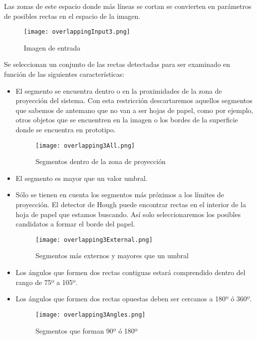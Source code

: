 Las zonas de este espacio donde más líneas se cortan se convierten en parámetros de posibles rectas
en el espacio de la imagen.

 \begin{figure}[h!] 
    \centering
    \texttt{[image: overlappingInput3.png]}
    \caption{Imagen de entrada}
    \label{fig:overlapping}
  \end{figure}

Se seleccionan un conjunto de las rectas detectadas para ser examinado en función de las siguientes características:

\begin{itemize}
\item El segmento se encuentra dentro o en la proximidades de la zona de proyección del
  sistema. Con esta restricción descartaremos aquellos segmentos que sabemos de antemano que no van
  a ser hojas de papel, como por ejemplo, otros objetos que se encuentren en la imagen o los bordes
  de la superficie donde se encuentra en prototipo.
  \begin{figure}[h!] 
    \centering
    \texttt{[image: overlapping3All.png]}
    \caption{Segmentos dentro de la zona de proyección}
    \label{fig:overlappingAll}
  \end{figure}
  
\item El segmento es mayor que un valor umbral.
\item Sólo se tienen en cuenta los segmentos más próximos a los límites de proyección. El detector
  de Hough puede encontrar rectas en el interior de la hoja de papel que estamos buscando. Así solo
  seleccionaremos los posibles candidatos a formar el borde del papel.
   \begin{figure}[h!] 
    \centering
    \texttt{[image: overlapping3External.png]}
    \caption{Segmentos más externos y mayores que un umbral}
    \label{fig:overlappingExt}
  \end{figure}


\item Los ángulos que formen dos rectas contiguas estará comprendido dentro del rango de 75º a 105º.
\item Los ángulos que formen dos rectas opuestas deben ser cercanos a 180º ó 360º.
  \begin{figure}[h!] 
    \centering
    \texttt{[image: overlapping3Angles.png]}
    \caption{Segmentos que forman 90º ó 180º}
    \label{fig:overlappingAngles}
  \end{figure}

\end{itemize}


